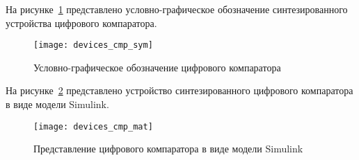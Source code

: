 \documentclass[document.tex]{subfiles}
\begin{document}
\clearpage

На рисунке~\ref{fig:devicecmp} представлено условно-графическое обозначение
синтезированного устройства цифрового компаратора.

\begin{figure}[here]
\centering
\texttt{[image: devices\_cmp\_sym]}
\caption{Условно-графическое обозначение цифрового компаратора}
\label{fig:devicecmp}
\end{figure}

На рисунке~\ref{fig:devicecmpmat} представлено устройство
синтезированного цифрового компаратора в виде модели Simulink.

\begin{figure}[here]
\texttt{[image: devices\_cmp\_mat]}
\caption{Представление цифрового компаратора в виде модели Simulink}
\label{fig:devicecmpmat}
\end{figure}
\end{document}
